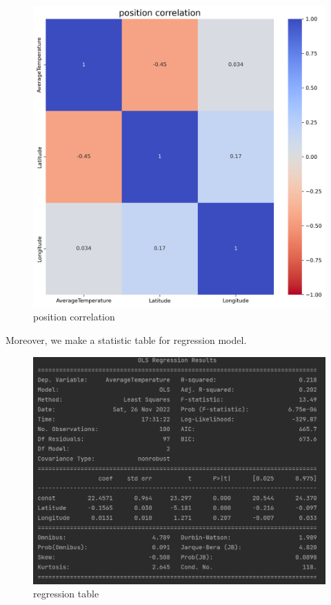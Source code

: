 \documentclass{apmcmthesis}
\begin{document}
  \begin{figure}[htbp]
    \centering
    \includegraphics[scale=0.4]{position correlation.png}
    \caption{position correlation}
  \end{figure}
  
  Moreover, we make a statistic table for regression model.
  
  \begin{figure}[htbp]
    \centering
    \includegraphics[scale=0.52]{2a table.png}
    \caption{regression table}
  \end{figure}
  
\end{document}
